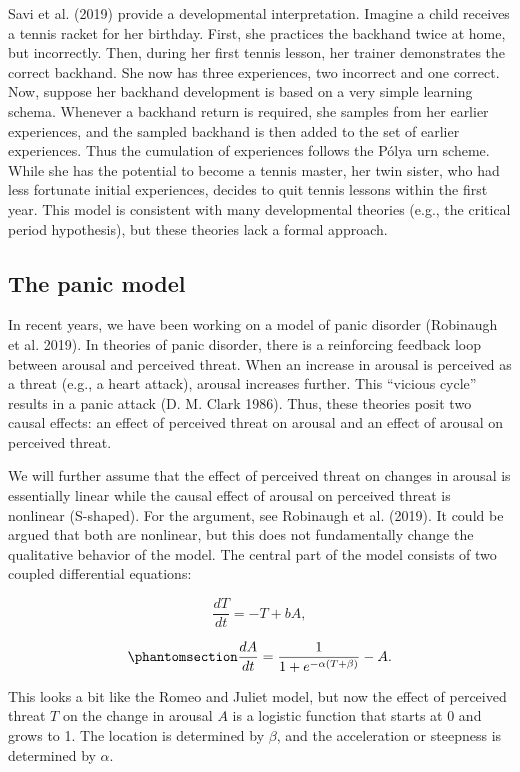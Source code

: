 \documentclass[
  a4paper,
  DIV=11,
  numbers=noendperiod,
  oneside]{scrreprt}
\begin{document}
Savi et al. (2019) provide a developmental interpretation. Imagine a
child receives a tennis racket for her birthday. First, she practices
the backhand twice at home, but incorrectly. Then, during her first
tennis lesson, her trainer demonstrates the correct backhand. She now
has three experiences, two incorrect and one correct. Now, suppose her
backhand development is based on a very simple learning schema. Whenever
a backhand return is required, she samples from her earlier experiences,
and the sampled backhand is then added to the set of earlier
experiences. Thus the cumulation of experiences follows the Pólya urn
scheme. While she has the potential to become a tennis master, her twin
sister, who had less fortunate initial experiences, decides to quit
tennis lessons within the first year. This model is consistent with many
developmental theories (e.g., the critical period hypothesis), but these
theories lack a formal approach.

\subsection{The panic model}\label{sec-The-panic-model}

In recent years, we have been working on a model of panic disorder
(Robinaugh et al. 2019). In theories of panic disorder, there is a
reinforcing feedback loop between arousal and perceived threat. When an
increase in arousal is perceived as a threat (e.g., a heart attack),
arousal increases further. This ``vicious cycle'' results in a panic
attack (D. M. Clark 1986). Thus, these theories posit two causal
effects: an effect of perceived threat on arousal and an effect of
arousal on perceived threat.

We will further assume that the effect of perceived threat on changes in
arousal is essentially linear while the causal effect of arousal on
perceived threat is nonlinear (S-shaped). For the argument, see
Robinaugh et al. (2019). It could be argued that both are nonlinear, but
this does not fundamentally change the qualitative behavior of the
model. The central part of the model consists of two coupled
differential equations:

\[\frac{dT}{dt} = - T + bA,\]

\begin{equation}\phantomsection\label{eq-ch4n-14-old-34}{
\frac{dA}{dt} = \frac{1}{1 + e^{- \alpha(T + \beta)}} - A.
}\end{equation}

This looks a bit like the Romeo and Juliet model, but now the effect of
perceived threat \(T\) on the change in arousal \(A\) is a logistic
function that starts at 0 and grows to 1. The location is determined by
\(\beta\), and the acceleration or steepness is determined by
\(\alpha\).
\end{document}
